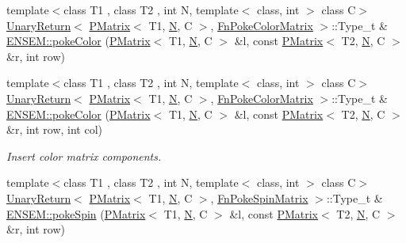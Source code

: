 \begin{DoxyCompactItemize}
{\footnotesize template$<$class T1 , class T2 , int N, template$<$ class, int $>$ class C$>$ }\\\mbox{\hyperlink{structENSEM_1_1UnaryReturn}{Unary\+Return}}$<$ \mbox{\hyperlink{classENSEM_1_1PMatrix}{P\+Matrix}}$<$ T1, \mbox{\hyperlink{adat__devel_2lib_2hadron_2operator__name__util_8cc_a7722c8ecbb62d99aee7ce68b1752f337}{N}}, C $>$, \mbox{\hyperlink{structENSEM_1_1FnPokeColorMatrix}{Fn\+Poke\+Color\+Matrix}} $>$\+::Type\+\_\+t \& \mbox{\hyperlink{group__primmatrix_ga0cfeefefe2bd8b4e365ac10d8853664a}{E\+N\+S\+E\+M\+::poke\+Color}} (\mbox{\hyperlink{classENSEM_1_1PMatrix}{P\+Matrix}}$<$ T1, \mbox{\hyperlink{adat__devel_2lib_2hadron_2operator__name__util_8cc_a7722c8ecbb62d99aee7ce68b1752f337}{N}}, C $>$ \&l, const \mbox{\hyperlink{classENSEM_1_1PMatrix}{P\+Matrix}}$<$ T2, \mbox{\hyperlink{adat__devel_2lib_2hadron_2operator__name__util_8cc_a7722c8ecbb62d99aee7ce68b1752f337}{N}}, C $>$ \&r, int row)
\item 
{\footnotesize template$<$class T1 , class T2 , int N, template$<$ class, int $>$ class C$>$ }\\\mbox{\hyperlink{structENSEM_1_1UnaryReturn}{Unary\+Return}}$<$ \mbox{\hyperlink{classENSEM_1_1PMatrix}{P\+Matrix}}$<$ T1, \mbox{\hyperlink{adat__devel_2lib_2hadron_2operator__name__util_8cc_a7722c8ecbb62d99aee7ce68b1752f337}{N}}, C $>$, \mbox{\hyperlink{structENSEM_1_1FnPokeColorMatrix}{Fn\+Poke\+Color\+Matrix}} $>$\+::Type\+\_\+t \& \mbox{\hyperlink{group__primmatrix_gab840db69dc60bcb095f46b69353d09f3}{E\+N\+S\+E\+M\+::poke\+Color}} (\mbox{\hyperlink{classENSEM_1_1PMatrix}{P\+Matrix}}$<$ T1, \mbox{\hyperlink{adat__devel_2lib_2hadron_2operator__name__util_8cc_a7722c8ecbb62d99aee7ce68b1752f337}{N}}, C $>$ \&l, const \mbox{\hyperlink{classENSEM_1_1PMatrix}{P\+Matrix}}$<$ T2, \mbox{\hyperlink{adat__devel_2lib_2hadron_2operator__name__util_8cc_a7722c8ecbb62d99aee7ce68b1752f337}{N}}, C $>$ \&r, int row, int col)
\begin{DoxyCompactList}\small\item\em Insert color matrix components. \end{DoxyCompactList}\item 
{\footnotesize template$<$class T1 , class T2 , int N, template$<$ class, int $>$ class C$>$ }\\\mbox{\hyperlink{structENSEM_1_1UnaryReturn}{Unary\+Return}}$<$ \mbox{\hyperlink{classENSEM_1_1PMatrix}{P\+Matrix}}$<$ T1, \mbox{\hyperlink{adat__devel_2lib_2hadron_2operator__name__util_8cc_a7722c8ecbb62d99aee7ce68b1752f337}{N}}, C $>$, \mbox{\hyperlink{structENSEM_1_1FnPokeSpinMatrix}{Fn\+Poke\+Spin\+Matrix}} $>$\+::Type\+\_\+t \& \mbox{\hyperlink{group__primmatrix_ga738f0f1d3bad8770111452c72714a4ae}{E\+N\+S\+E\+M\+::poke\+Spin}} (\mbox{\hyperlink{classENSEM_1_1PMatrix}{P\+Matrix}}$<$ T1, \mbox{\hyperlink{adat__devel_2lib_2hadron_2operator__name__util_8cc_a7722c8ecbb62d99aee7ce68b1752f337}{N}}, C $>$ \&l, const \mbox{\hyperlink{classENSEM_1_1PMatrix}{P\+Matrix}}$<$ T2, \mbox{\hyperlink{adat__devel_2lib_2hadron_2operator__name__util_8cc_a7722c8ecbb62d99aee7ce68b1752f337}{N}}, C $>$ \&r, int row)

\end{DoxyCompactItemize}
